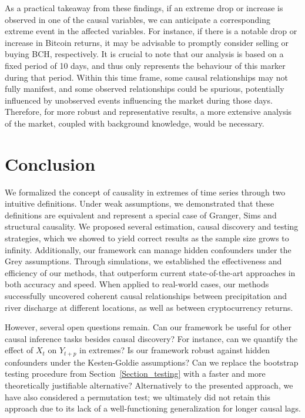 \documentclass[a4paper,11pt]{article}
\begin{document}
As a practical takeaway from these findings, if an extreme drop or increase is observed in one of the causal variables, 
we can anticipate a corresponding extreme event in the affected variables. For instance, if there is a notable drop or increase in Bitcoin returns, it may be advisable to promptly consider selling or buying BCH, respectively. 
It is crucial to note that our analysis is based on a fixed period of 10 days, and thus only represents the behaviour of this marker during that period. 
Within this time frame, some causal relationships may not fully manifest, and some observed relationships could be spurious, potentially influenced by unobserved events influencing the market during those days. 
Therefore, for more robust and representative results, a more extensive analysis of the market, coupled with background knowledge, would be necessary.






\section{Conclusion}


We formalized the concept of causality in extremes of time series through two intuitive definitions. Under weak assumptions, we demonstrated that these definitions are equivalent and represent a special case of Granger, Sims and structural causality. We proposed several estimation, causal discovery and testing strategies, which we showed to yield correct results as the sample size grows to infinity. Additionally, our framework can manage hidden confounders under the Grey assumptions. Through simulations, we established the effectiveness and efficiency of our methods, that outperform current state-of-the-art approaches in both accuracy and speed. When applied to real-world cases, our methods successfully uncovered coherent causal relationships between precipitation and river discharge at different locations, as well as between cryptocurrency returns.

However, several open questions remain. Can our framework be useful for other causal inference tasks besides causal discovery? For instance, can we quantify the effect of $X_t$ on $Y_{t+p}$ in extremes? Is our framework robust against hidden confounders under the Kesten-Goldie assumptions? Can we replace the bootstrap testing procedure from Section~\ref{Section_testing} with a faster and more theoretically justifiable alternative? Alternatively to the presented approach, we have also considered a permutation test; we ultimately did not retain this approach due to its lack of a well-functioning generalization for longer causal lags.
\end{document}
